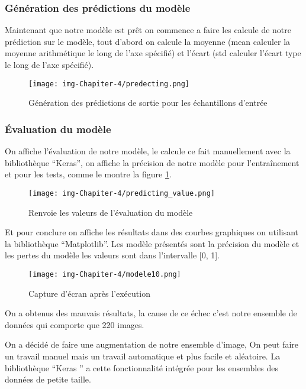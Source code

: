 \documentclass[12pt]{article}
\begin{document}
\subsubsection*{Génération des prédictions du modèle}
Maintenant que notre modèle est prêt on commence a faire les calcule de notre prédiction sur le modèle, tout d'abord on calcule la moyenne (mean calculer la moyenne arithmétique le long de l'axe spécifié) et l’écart (std calculer l'écart type le long de l'axe spécifié).

\begin{figure}[h]
	\centering
	\texttt{[image: img-Chapiter-4/predecting.png]}
	\caption{Génération des prédictions de sortie pour les échantillons d'entrée}
\end{figure}

\subsubsection*{Évaluation du modèle}

On affiche l’évaluation de notre modèle, le calcule ce fait manuellement avec la bibliothèque “Keras”, on affiche la précision de notre modèle pour l’entraînement et pour les tests, comme le montre la figure \ref{fig:prédicting}.
\newpage
\begin{figure}[h]
	\centering
	\texttt{[image: img-Chapiter-4/predicting\_value.png]}
	\caption{Renvoie les valeurs de l’évaluation du modèle}
	\label{fig:prédicting}
\end{figure}

Et pour conclure on affiche les résultats dans des courbes graphiques on utilisant la bibliothèque “Matplotlib”. Les modèle présentés sont la précision du modèle et les pertes du modèle les valeurs sont dans l’intervalle [0, 1].

\begin{figure}[h]
	\centering
	\texttt{[image: img-Chapiter-4/modele10.png]}
	\caption{Capture d’écran après l’exécution}
\end{figure}

On a obtenus des mauvais résultats, la cause de ce échec c'est notre ensemble de données qui comporte que 220 images.

On a décidé de faire une augmentation de notre ensemble d’image, On peut faire un travail manuel mais un travail automatique et plus facile et aléatoire. La bibliothèque “Keras ” a cette fonctionnalité intégrée pour les ensembles des données de petite taille.
\end{document}

